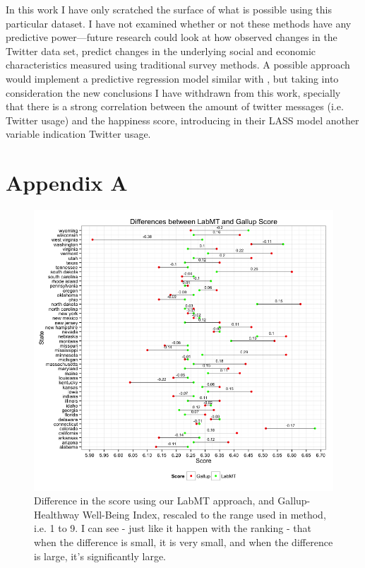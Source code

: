 \documentclass{llncs}
\begin{document}
In this work I have only scratched the surface of what is possible using this particular dataset. I have not examined whether or not these methods have any predictive power—future research could look at how observed changes in the Twitter data set, predict changes in the underlying social and economic characteristics measured using traditional survey methods. A possible approach would implement a predictive regression model similar with \cite{Schwartz2013}, but taking into consideration the new conclusions I have withdrawn from this work, specially that there is a strong correlation between the amount of twitter messages (i.e. Twitter usage) and the happiness score, introducing in their LASS model another variable indication Twitter usage.




\section*{Appendix A}

\begin{figure}
\centering
\includegraphics[width=\textwidth]{images/differences}
\caption{Difference in the score using our LabMT approach, and Gallup-Healthway Well-Being Index, rescaled to the range used in \cite{Dodds2009,Dodds2011} method, i.e. 1 to 9. I can see - just like it happen with the ranking - that when the difference is small, it is very small, and when the difference is large, it's significantly large.}
\label{fig:differences}
\end{figure}
\end{document}
